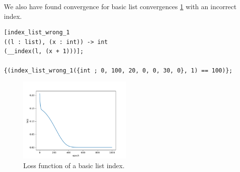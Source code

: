 \documentclass{article}
\begin{document}
\begin{minipage}{\textwidth}
We also have found convergence for basic list convergences \ref{fig:list_index} with an incorrect index.
\begin{verbatim}
[index_list_wrong_1
((l : list), (x : int)) -> int
(__index(l, (x + 1)))];

{(index_list_wrong_1({int ; 0, 100, 20, 0, 0, 30, 0}, 1) == 100)};
\end{verbatim}
\end{minipage}
\begin{figure}[h!]
  \begin{center}
    \includegraphics[width=0.5\textwidth]{list_index.png}
  \end{center}
  \caption{Loss function of a basic list index.}
  \label{fig:list_index}
\end{figure}
\end{document}

